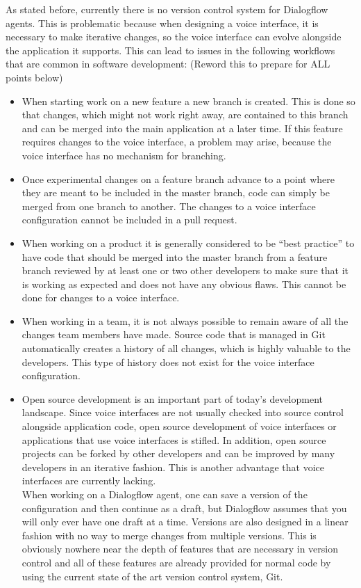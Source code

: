 As stated before, currently there is no version control system for Dialogflow agents.
This is problematic because when designing a voice interface, it is necessary to make iterative changes, so the voice interface can evolve alongside the application it supports. This can lead to issues in the following workflows that are common in software development:  (Reword this to prepare for ALL points below)
\begin{itemize}
    \item When starting work on a new feature a new branch is created. This is done so that changes, which might not work right away, are contained to this branch and can be merged into the main application at a later time. If this feature requires changes to the voice interface, a problem may arise, because the voice interface has no mechanism for branching.
    \item Once experimental changes on a feature branch advance to a point where they are meant to be included in the master branch, code can simply be merged from one branch to another. The changes to a voice interface configuration cannot be included in a pull request.
    \item When working on a product it is generally considered to be “best practice” to have code that should be merged into the master branch from a feature branch reviewed by at least one or two other developers to make sure that it is working as expected and does not have any obvious flaws. This cannot be done for changes to a voice interface.
    \item When working in a team, it is not always possible to remain aware of all the changes team members have made. Source code that is managed in Git automatically creates a history of all changes, which is highly valuable to the developers. This type of history does not exist for the voice interface configuration.
    \item Open source development is an important part of today's development landscape. Since voice interfaces are not usually checked into source control alongside application code, open source development of voice interfaces or applications that use voice interfaces is stifled. In addition, open source projects can be forked by other developers and can be improved by many developers in an iterative fashion. This is another advantage that voice interfaces are currently lacking. \\
          When working on a Dialogflow agent, one can save a version of the configuration and then continue as a draft, but Dialogflow assumes that you will only ever have one draft at a time. Versions are also designed in a linear fashion with no way to merge changes from multiple versions. This is obviously nowhere near the depth of features that are necessary in version control and all of these features are already provided for normal code by using the current state of the art version control system, Git.
\end{itemize}


